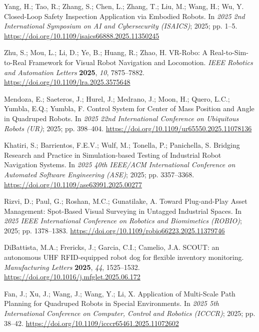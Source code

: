 Yang, H.; Tao, R.; Zhang, S.; Chen, L.; Zhang, T.; Liu, M.; Wang, H.; Wu, Y. Closed-Loop Safety Inspection Application via Embodied Robots. In \emph{2025 2nd International Symposium on AI and Cybersecurity (ISAICS)}; 2025; pp. 1--5. \url{https://doi.org/10.1109/isaics66888.2025.11350245}

Zhu, S.; Mou, L.; Li, D.; Ye, B.; Huang, R.; Zhao, H. VR-Robo: A Real-to-Sim-to-Real Framework for Visual Robot Navigation and Locomotion. \emph{IEEE Robotics and Automation Letters} \textbf{2025}, \emph{10}, 7875--7882. \url{https://doi.org/10.1109/lra.2025.3575648}

Mendoza, E.; Saeteros, J.; Hurel, J.; Medrano, J.; Moon, H.; Quero, L.C.; Yumbla, E.Q.; Yumbla, F. Control System for Center of Mass Position and Angle in Quadruped Robots. In \emph{2025 22nd International Conference on Ubiquitous Robots (UR)}; 2025; pp. 398--404. \url{https://doi.org/10.1109/ur65550.2025.11078136}

Khatiri, S.; Barrientos, F.E.V.; Wulf, M.; Tonella, P.; Panichella, S. Bridging Research and Practice in Simulation-based Testing of Industrial Robot Navigation Systems. In \emph{2025 40th IEEE/ACM International Conference on Automated Software Engineering (ASE)}; 2025; pp. 3357--3368. \url{https://doi.org/10.1109/ase63991.2025.00277}

Rizvi, D.; Paul, G.; Roshan, M.C.; Gunatilake, A. Toward Plug-and-Play Asset Management: Spot-Based Visual Surveying in Untagged Industrial Spaces. In \emph{2025 IEEE International Conference on Robotics and Biomimetics (ROBIO)}; 2025; pp. 1378--1383. \url{https://doi.org/10.1109/robio66223.2025.11379746}

DiBattista, M.A.; Frericks, J.; Garcia, C.I.; Camelio, J.A. SCOUT: an autonomous UHF RFID-equipped robot dog for flexible inventory monitoring. \emph{Manufacturing Letters} \textbf{2025}, \emph{44}, 1525--1532. \url{https://doi.org/10.1016/j.mfglet.2025.06.172}

Fan, J.; Xu, J.; Wang, J.; Wang, Y.; Li, X. Application of Multi-Scale Path Planning for Quadruped Robots in Special Environments. In \emph{2025 5th International Conference on Computer, Control and Robotics (ICCCR)}; 2025; pp. 38--42. \url{https://doi.org/10.1109/icccr65461.2025.11072602}

